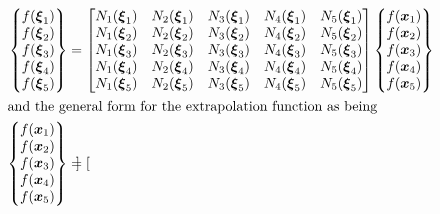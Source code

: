 \begin{subequations}
    \label{extrapolationPentagon}
    \begin{align} 
    \left\{ \begin{matrix}
    f ( \boldsymbol{\xi}_1 ) \\ 
    f ( \boldsymbol{\xi}_2 ) \\ 
    f ( \boldsymbol{\xi}_3 ) \\ 
    f ( \boldsymbol{\xi}_4 ) \\ 
    f ( \boldsymbol{\xi}_5 )
    \end{matrix} \right\} & = \begin{bmatrix}
    N_1 (\boldsymbol{\xi}_1) & N_2 (\boldsymbol{\xi}_1) & 
    N_3 (\boldsymbol{\xi}_1) & N_4 (\boldsymbol{\xi}_1) & 
    N_5 (\boldsymbol{\xi}_1) \\
    N_1 (\boldsymbol{\xi}_2) & N_2 (\boldsymbol{\xi}_2) &
    N_3 (\boldsymbol{\xi}_2) & N_4 (\boldsymbol{\xi}_2) & 
    N_5 (\boldsymbol{\xi}_2) \\
    N_1 (\boldsymbol{\xi}_3) & N_2 (\boldsymbol{\xi}_3) & 
    N_3 (\boldsymbol{\xi}_3) & N_4 (\boldsymbol{\xi}_3) & 
    N_5 (\boldsymbol{\xi}_3) \\
    N_1 (\boldsymbol{\xi}_4) & N_2 (\boldsymbol{\xi}_4) & 
    N_3 (\boldsymbol{\xi}_4) & N_4 (\boldsymbol{\xi}_4) & 
    N_5 (\boldsymbol{\xi}_4) \\
    N_1 (\boldsymbol{\xi}_5) & N_2 (\boldsymbol{\xi}_5) & 
    N_3 (\boldsymbol{\xi}_5) & N_4 (\boldsymbol{\xi}_5) & 
    N_5 (\boldsymbol{\xi}_5) 
    \end{bmatrix} 
    \left\{ \begin{matrix} 
    f ( \boldsymbol{x}_1 ) \\ 
    f ( \boldsymbol{x}_2 ) \\ 
    f ( \boldsymbol{x}_3 ) \\
    f ( \boldsymbol{x}_4 ) \\
    f ( \boldsymbol{x}_5 )
    \end{matrix} \right\} \\
    \intertext{and the general form for the extrapolation function as being}
    \left\{ \begin{matrix} 
    f ( \boldsymbol{x}_1 ) \\ 
    f ( \boldsymbol{x}_2 ) \\ 
    f ( \boldsymbol{x}_3 ) \\
    f ( \boldsymbol{x}_4 ) \\
    f ( \boldsymbol{x}_5 )
    \end{matrix} \right\} & = \begin{bmatrix}

\end{bmatrix}
\end{align}
\end{subequations}
